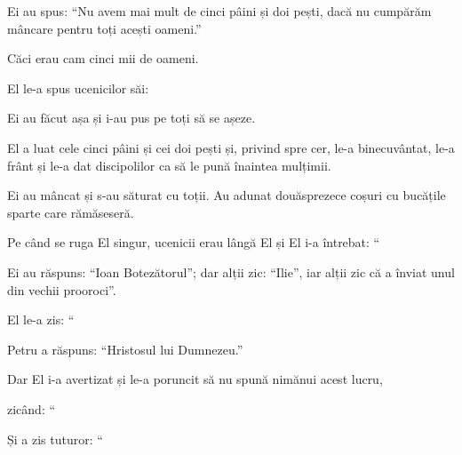 {\par }{\PP Ei au spus: “Nu avem mai mult de cinci pâini și doi pești, dacă nu cumpărăm mâncare pentru toți acești oameni.”

Căci erau cam cinci mii de oameni.

\par }{\PP El le-a spus ucenicilor săi:
{}

Ei au făcut așa și i-au pus pe toți să se așeze.

El a luat cele cinci pâini și cei doi pești și, privind spre cer, le-a binecuvântat, le-a frânt și le-a dat discipolilor ca să le pună înaintea mulțimii.

Ei au mâncat și s-au săturat cu toții. Au adunat douăsprezece coșuri cu bucățile sparte care rămăseseră.


\par }{\PP {}Pe când se ruga El singur, ucenicii erau lângă El și El i-a întrebat: “{}


\par }{\PP {}Ei au răspuns: “Ioan Botezătorul”; dar alții zic: “Ilie”, iar alții zic că a înviat unul din vechii prooroci”.


\par }{\PP {}El le-a zis: “{}

\par }{\PP Petru a răspuns: “Hristosul lui Dumnezeu.”


\par }{\PP {}Dar El i-a avertizat și le-a poruncit să nu spună nimănui acest lucru,

zicând: “{}


\par }{\PP {}Și a zis tuturor: “{}




}
